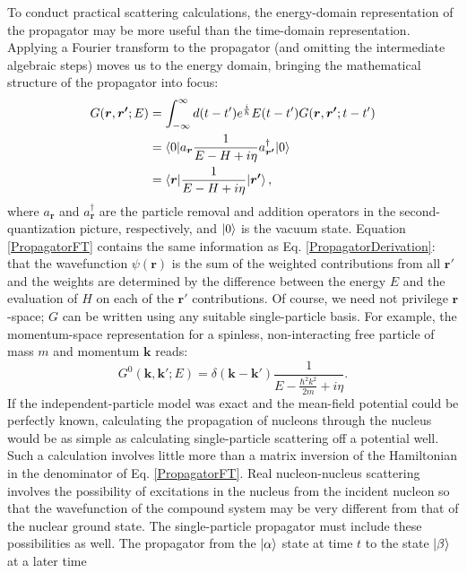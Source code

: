 To conduct practical scattering calculations, the energy-domain representation
of the propagator
may be more useful than the time-domain representation. Applying a Fourier transform to the propagator
(and omitting the intermediate algebraic steps) moves us to the energy domain,
bringing the mathematical structure of the propagator into focus:
\begin{equation} \label{PropagatorFT}
    \begin{split}
        G(\bm{r},\bm{r'};E) & = \int_{-\infty}^{\infty}d(t-t')e^\frac{i}{\hbar}E(t-t')G(\bm{r},\bm{r'}; t-t')\\
        & = \braket{0|a_{\bm{r}}\frac{1}{E-H+i\eta}a^{\dagger}_{\bm{r'}}|0}\\
        & = \braket{\bm{r} | \frac{1}{E-H+i\eta} | \bm{r'}},
    \end{split}
\end{equation}
where $a_{\bm{r}}$ and $a^{\dagger}_{\bm{r}}$ are the particle removal and
addition operators in
the second-quantization picture, respectively, and $\ket{0}$ is the vacuum state.
Equation \ref{PropagatorFT} contains the same information as Eq. \ref{PropagatorDerivation}: that
the wavefunction $\psi(\bm{r})$ is the sum of the weighted contributions from
all $\bm{r'}$ and the weights
are determined by the difference between the energy $E$ and the evaluation of
$H$ on each of the $\bm{r'}$
contributions. Of course, we need not privilege $\bm{r}$-space; $G$ can be written using any
suitable single-particle basis. For example, the momentum-space representation for a spinless,
non-interacting free particle of mass $m$ and momentum $\bm{k}$ reads:
\begin{equation} \label{PropagatorKSpace}
    G^{0}(\bm{k}, \bm{k'}; E) =
    \delta(\bm{k}-\bm{k'})\frac{1}{E-\frac{\hbar^{2}k^{2}}{2m} + i\eta}.
\end{equation}
If the independent-particle model was exact and the mean-field potential could be perfectly known,
calculating the propagation of nucleons through the nucleus would be as simple as calculating
single-particle scattering off a potential well. Such a calculation involves little more than
a matrix inversion of the Hamiltonian in the denominator of Eq. \ref{PropagatorFT}.
Real nucleon-nucleus scattering involves the possibility of excitations in the nucleus from the 
incident
nucleon so that the wavefunction of the compound system may be
very different from that of the nuclear ground state.
The single-particle propagator must include these possibilities as well.
The propagator from the $\ket{\alpha}$ state at time $t$ to the state $\ket{\beta}$ at a later time
